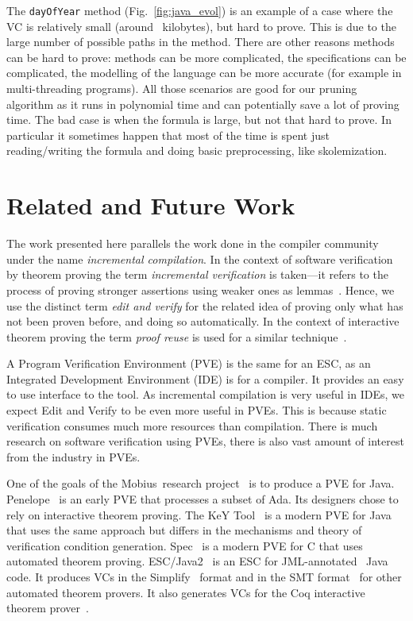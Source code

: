 \documentclass{llncs}
\def\lstinlinen{\lstinline[basicstyle=\normalsize\sffamily]}
\def\mobius{{\sc Mobius}}
\def\escjava{\hskip 0pt\hbox{ESC/Java2}}
\begin{document}
The \lstinlinen|dayOfYear| method (Fig.~\ref{fig:java_evol}) is 
an example of a case where the VC is relatively small (around 
~kilobytes), but hard to prove. This is due to the large 
number of possible paths in the method.
There are other reasons methods can be hard to prove: methods can be more complicated,
the specifications can be complicated, the modelling of the language can
be more accurate (for example in multi-threading programs). All those
scenarios are good for our pruning algorithm as it runs in polynomial
time and can potentially save a lot of proving time. The bad case is
when the formula is large, but not that hard to prove. In particular it
sometimes happen that most of the time is spent just reading/writing
the formula and doing basic preprocessing, like skolemization.


\section{Related and Future Work}
\label{sec:related}

The work presented here parallels the work done in the
compiler community under the name \emph{incremental compilation}.
In the context of software verification by theorem
proving the term \emph{incremental verification} is
taken---it refers to the process of proving stronger
assertions using weaker ones as lemmas~\cite{uribe2000cmc}. 
Hence, we use the distinct term \emph{edit and verify} 
for the related idea of proving only what has not been
proven before, and doing so automatically. In the context
of interactive theorem proving the term \emph{proof reuse}
is used for a similar technique~\cite{proof_reuse}.

A Program Verification Environment (PVE) is the same for an ESC,
as an Integrated Development Environment (IDE) is for a compiler.
It provides an easy to use interface to the tool. As incremental
compilation is very useful in IDEs, we expect Edit and Verify
to be even more useful in PVEs. This is because static verification
consumes much more resources than compilation. There is
much research on software verification using PVEs, there is also
vast amount of interest from the industry in PVEs.

One of the goals of the \mobius\ research project~\cite{mobius}
is to produce a PVE for Java. Penelope~\cite{guaspari1990fva} is an early PVE that
processes a subset of Ada. Its designers chose to rely
on interactive theorem proving. The KeY Tool~\cite{KeyBook2007}
is a modern PVE for Java that uses the same approach but differs
in the mechanisms and theory of verification condition generation.
Spec~\cite{boogie} is a modern PVE for C that uses automated
theorem proving.  \escjava~\cite{escjava,cok2005eju} is an ESC for
JML-annotated~\cite{leavens1999jnd} Java code.  It produces VCs in the
Simplify~\cite{simplify} format and in the SMT format~\cite{smtlib}
for other automated theorem provers. It also generates VCs for the Coq
interactive theorem prover~\cite{coq}.
\end{document}
